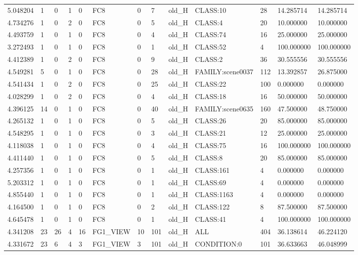 \begin{tabular}{lllllllllllll}
5.048204 & 1 & 0 & 1 & 0 & FC8 & 0 & 7 & old\_H & CLASS:10 & 28 & 14.285714 & 14.285714 \\
4.734276 & 1 & 0 & 2 & 0 & FC8 & 0 & 5 & old\_H & CLASS:4 & 20 & 10.000000 & 10.000000 \\
4.493759 & 1 & 0 & 1 & 0 & FC8 & 0 & 4 & old\_H & CLASS:74 & 16 & 25.000000 & 25.000000 \\
3.272493 & 1 & 0 & 1 & 0 & FC8 & 0 & 1 & old\_H & CLASS:52 & 4 & 100.000000 & 100.000000 \\
4.412389 & 1 & 0 & 2 & 0 & FC8 & 0 & 9 & old\_H & CLASS:2 & 36 & 30.555556 & 30.555556 \\
4.549281 & 5 & 0 & 1 & 0 & FC8 & 0 & 28 & old\_H & FAMILY:scene0037 & 112 & 13.392857 & 26.875000 \\
4.541434 & 1 & 0 & 2 & 0 & FC8 & 0 & 25 & old\_H & CLASS:22 & 100 & 0.000000 & 0.000000 \\
4.028299 & 1 & 0 & 2 & 0 & FC8 & 0 & 4 & old\_H & CLASS:18 & 16 & 50.000000 & 50.000000 \\
4.396125 & 14 & 0 & 1 & 0 & FC8 & 0 & 40 & old\_H & FAMILY:scene0635 & 160 & 47.500000 & 48.750000 \\
4.265132 & 1 & 0 & 1 & 0 & FC8 & 0 & 5 & old\_H & CLASS:26 & 20 & 85.000000 & 85.000000 \\
4.548295 & 1 & 0 & 1 & 0 & FC8 & 0 & 3 & old\_H & CLASS:21 & 12 & 25.000000 & 25.000000 \\
4.118038 & 1 & 0 & 1 & 0 & FC8 & 0 & 4 & old\_H & CLASS:75 & 16 & 100.000000 & 100.000000 \\
4.411440 & 1 & 0 & 1 & 0 & FC8 & 0 & 5 & old\_H & CLASS:8 & 20 & 85.000000 & 85.000000 \\
4.257356 & 1 & 0 & 1 & 0 & FC8 & 0 & 1 & old\_H & CLASS:161 & 4 & 0.000000 & 0.000000 \\
5.203312 & 1 & 0 & 1 & 0 & FC8 & 0 & 1 & old\_H & CLASS:69 & 4 & 0.000000 & 0.000000 \\
4.855440 & 1 & 0 & 1 & 0 & FC8 & 0 & 1 & old\_H & CLASS:1163 & 4 & 0.000000 & 0.000000 \\
4.164500 & 1 & 0 & 1 & 0 & FC8 & 0 & 2 & old\_H & CLASS:122 & 8 & 87.500000 & 87.500000 \\
4.645478 & 1 & 0 & 1 & 0 & FC8 & 0 & 1 & old\_H & CLASS:41 & 4 & 100.000000 & 100.000000 \\
4.341208 & 23 & 26 & 4 & 16 & FG1\_VIEW & 10 & 101 & old\_H & ALL & 404 & 36.138614 & 46.224120 \\
4.331672 & 23 & 6 & 4 & 3 & FG1\_VIEW & 3 & 101 & old\_H & CONDITION:0 & 101 & 36.633663 & 46.048999 \\

\end{tabular}
